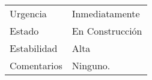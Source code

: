\begin{table}[H]
\begin{tabular}{ll}
		Urgencia     & Inmediatamente                                                                                                                                                                                                       \\
		Estado       & En Construcci\'on                                                                                                                                                                                                      \\
		Estabilidad  & Alta                                                                                                                                                                                                                 \\
		Comentarios  & Ninguno.                                                                                                                                                                                                            
	\end{tabular}
\end{table}

